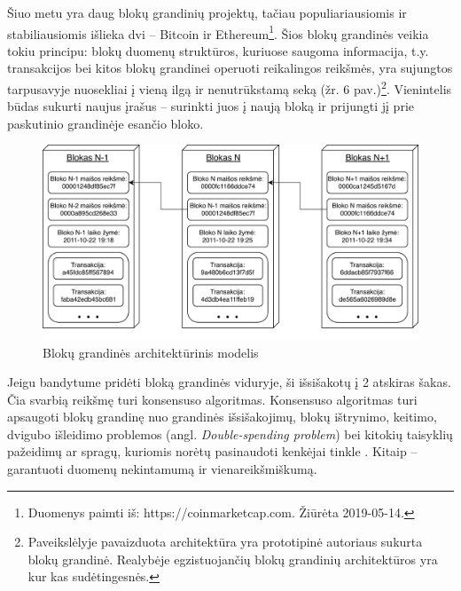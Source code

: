 Šiuo metu yra daug blokų grandinių projektų, tačiau populiariausiomis ir stabiliausiomis išlieka dvi – Bitcoin ir Ethereum\footnote{Duomenys paimti iš: https://coinmarketcap.com. Žiūrėta 2019-05-14.}. Šios blokų grandinės veikia tokiu principu: blokų duomenų struktūros, kuriuose saugoma informacija, t.y. transakcijos bei kitos blokų grandinei operuoti reikalingos reikšmės, yra sujungtos tarpusavyje nuosekliai į vieną ilgą ir nenutrūkstamą seką (žr. 6 pav.)\footnote{Paveikslėlyje pavaizduota architektūra yra prototipinė autoriaus sukurta blokų grandinė. Realybėje egzistuojančių blokų grandinių architektūros yra kur kas sudėtingesnės.}. Vienintelis būdas sukurti naujus įrašus – surinkti juos į naują bloką ir prijungti jį prie paskutinio grandinėje esančio bloko.

\begin{figure}[H]
    \centering
    \includegraphics[scale=0.85]{images/block-chain-architecture}
    \caption{Blokų grandinės architektūrinis modelis}
\end{figure}





Jeigu bandytume pridėti bloką grandinės viduryje, ši išsišakotų į 2 atskiras šakas. Čia svarbią reikšmę turi konsensuso algoritmas. Konsensuso algoritmas turi apsaugoti blokų grandinę nuo grandinės išsišakojimų, blokų ištrynimo, keitimo, dvigubo išleidimo problemos (angl. \textit{Double-spending problem}) bei kitokių taisyklių pažeidimų ar spragų, kuriomis norėtų pasinaudoti kenkėjai tinkle \cite{baliga2017understanding}. Kitaip – garantuoti duomenų nekintamumą ir vienareikšmiškumą.

